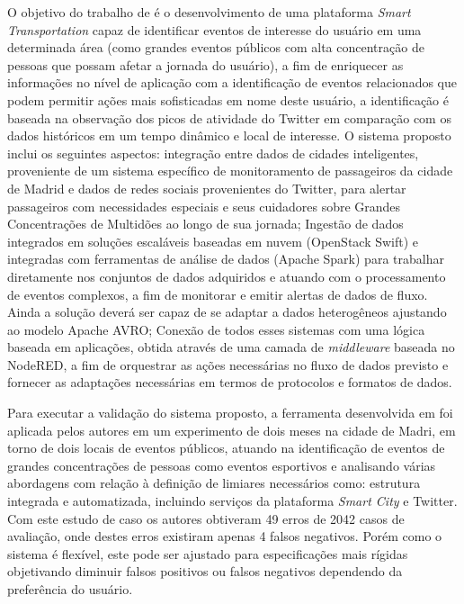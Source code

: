 \documentclass[ti,table]{texufpel} %
\begin{document}
     O objetivo do trabalho de \cite{art9kousiouris2018integrated} é o desenvolvimento de uma plataforma \textit{Smart Transportation} capaz de identificar eventos de interesse do usuário em uma determinada área (como grandes eventos públicos com alta concentração de pessoas que possam afetar a jornada do usuário), a fim de enriquecer as informações no nível de aplicação com a identificação de eventos relacionados que podem permitir ações mais sofisticadas em nome deste usuário, a identificação é baseada na observação dos picos de atividade do Twitter em comparação com os dados históricos em um tempo dinâmico e local de interesse. O sistema proposto inclui os seguintes aspectos: integração entre dados de cidades inteligentes, proveniente de um sistema específico de monitoramento de passageiros da cidade de Madrid e dados de redes sociais provenientes do Twitter, para alertar passageiros com necessidades especiais e seus cuidadores sobre Grandes Concentrações de Multidões ao longo de sua jornada; Ingestão de dados integrados em soluções escaláveis baseadas em nuvem (OpenStack Swift) e integradas com ferramentas de análise de dados (Apache Spark) para trabalhar diretamente nos conjuntos de dados adquiridos e atuando com o processamento de eventos complexos, a fim de monitorar e emitir alertas de dados de fluxo. Ainda a solução deverá ser capaz de se adaptar a dados heterogêneos ajustando ao modelo Apache AVRO; Conexão de todos esses sistemas com uma lógica baseada em aplicações, obtida através de uma camada de \textit{middleware} baseada no NodeRED, a fim de orquestrar as ações necessárias no fluxo de dados previsto e fornecer as adaptações necessárias em termos de protocolos e formatos de dados.     

     

     Para executar a validação do sistema proposto, a ferramenta desenvolvida em \cite{art9kousiouris2018integrated} foi aplicada pelos autores em um experimento de dois meses na cidade de Madri, em torno de dois locais de eventos públicos, atuando na identificação de eventos de grandes concentrações de pessoas como eventos esportivos e analisando várias abordagens com relação à definição de limiares necessários como: estrutura integrada e automatizada, incluindo serviços da plataforma \textit{Smart City} e Twitter. Com este estudo de caso os autores obtiveram 49 erros de 2042 casos de avaliação, onde destes erros existiram apenas 4 falsos negativos. Porém como o sistema é flexível, este pode ser ajustado para especificações mais rígidas objetivando diminuir falsos positivos ou falsos negativos dependendo da preferência do usuário. 
\end{document}
